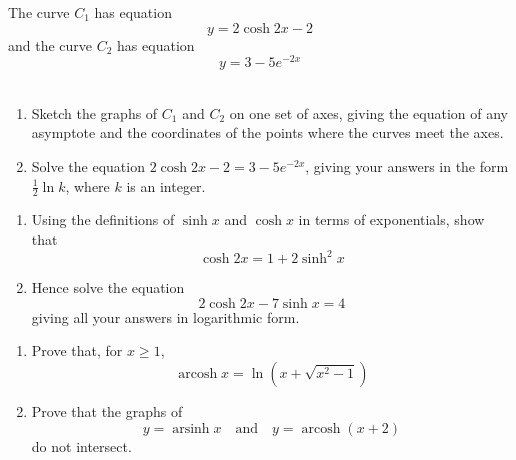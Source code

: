 \documentclass[leqno]{article}
\begin{document}
\begin{enumerate}[
  label=\textbf{\arabic*.},
  leftmargin=*,
  topsep=0pt,
  partopsep=0pt,
  parsep=0pt
]
\newpage

\questionitem

The curve $C_1$ has equation \[y=2\cosh 2x-2\] and the curve $C_2$ has equation \[y=3-5e^{-2x}\] \\
\begin{enumerate}[label=\textbf{(\alph*)}]
  \item Sketch the graphs of $C_1$ and $C_2$ on one set of axes, giving the equation of any asymptote and the coordinates of the points where the curves meet the axes.  \\
  \item Solve the equation $2\cosh 2x-2=3-5e^{-2x}$, giving your answers in the form $\frac{1}{2}\ln k$, where $k$ is an integer.  \\
\end{enumerate}

\newpage


\questionitem

\begin{enumerate}[label=\textbf{(\alph*)}]
  \item Using the definitions of $\sinh x$ and $\cosh x$ in terms of exponentials, show that \[\cosh 2x = 1+2\sinh^2 x\]  
  \item Hence solve the equation \[2\cosh 2x-7\sinh x=4\] giving all your answers in logarithmic form.  \\
\end{enumerate}

\newpage

\questionitem

\begin{enumerate}[label=\textbf{(\alph*)}]
  \item Prove that, for $x\ge 1$,
  \[
  \operatorname{arcosh} x = \ln\left(x+\sqrt{x^2-1}\right)
  \]
  \item Prove that the graphs of
  \[
  y=\operatorname{arsinh} x \quad \text{and} \quad y=\operatorname{arcosh}(x+2)
  \]
  do not intersect.  \\
\end{enumerate}

\newpage

\questionitem


\end{enumerate}
\end{document}
